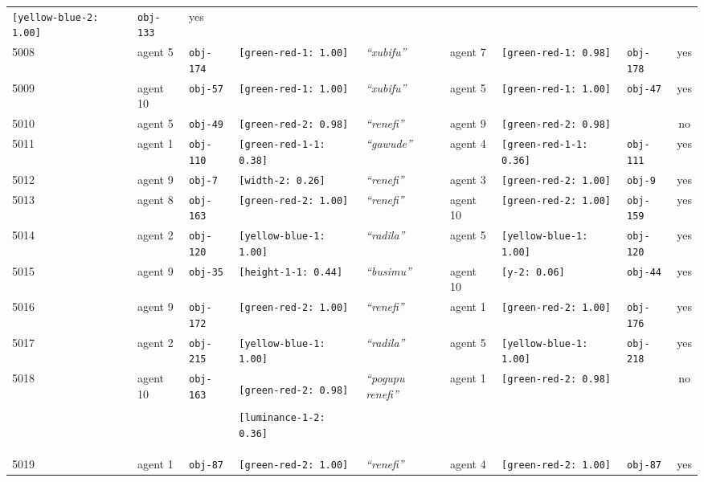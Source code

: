 {\begin{tabular}{@{}lllp{2.8cm}llp{2.8cm}lc@{}}
    \texttt{[yellow-blue-2: 1.00]} & \texttt{obj-133} & yes \\
    5008 & agent 5 & \texttt{obj-174} & \texttt{[green-red-1: 1.00]} & \textit{``xubifu''} & agent 7 & \texttt{[green-red-1: 0.98]} & \texttt{obj-178} & yes \\
    5009 & agent 10 & \texttt{obj-57} & \texttt{[green-red-1: 1.00]} & \textit{``xubifu''} & agent 5 & \texttt{[green-red-1: 1.00]} & \texttt{obj-47} & yes \\
    5010 & agent 5 & \texttt{obj-49} & \texttt{[green-red-2: 0.98]} & \textit{``renefi''} & agent 9 & \texttt{[green-red-2: 0.98]} & \texttt{} & no \\
    5011 & agent 1 & \texttt{obj-110} & \texttt{[green-red-1-1: 0.38]} & \textit{``gawude''} & agent 4 & \texttt{[green-red-1-1: 0.36]} & \texttt{obj-111} & yes \\
    5012 & agent 9 & \texttt{obj-7} & \texttt{[width-2: 0.26]} & \textit{``renefi''} & agent 3 & \texttt{[green-red-2: 1.00]} & \texttt{obj-9} & yes \\
    5013 & agent 8 & \texttt{obj-163} & \texttt{[green-red-2: 1.00]} & \textit{``renefi''} & agent 10 & \texttt{[green-red-2: 1.00]} & \texttt{obj-159} & yes \\
    5014 & agent 2 & \texttt{obj-120} & \texttt{[yellow-blue-1: 1.00]} & \textit{``radila''} & agent 5 & \texttt{[yellow-blue-1: 1.00]} & \texttt{obj-120} & yes \\
    5015 & agent 9 & \texttt{obj-35} & \texttt{[height-1-1: 0.44]} & \textit{``busimu''} & agent 10 & \texttt{[y-2: 0.06]} & \texttt{obj-44} & yes \\
    5016 & agent 9 & \texttt{obj-172} & \texttt{[green-red-2: 1.00]} & \textit{``renefi''} & agent 1 & \texttt{[green-red-2: 1.00]} & \texttt{obj-176} & yes \\
    5017 & agent 2 & \texttt{obj-215} & \texttt{[yellow-blue-1: 1.00]} & \textit{``radila''} & agent 5 & \texttt{[yellow-blue-1: 1.00]} & \texttt{obj-218} & yes \\
    5018 & agent 10 & \texttt{obj-163} & \texttt{[green-red-2: 0.98]}

    \texttt{[luminance-1-2: 0.36]} & \textit{``pogupu renefi''} & agent 1 & \texttt{[green-red-2: 0.98]} & \texttt{} & no \\
    5019 & agent 1 & \texttt{obj-87} & \texttt{[green-red-2: 1.00]} & \textit{``renefi''} & agent 4 & \texttt{[green-red-2: 1.00]} & \texttt{obj-87} & yes \\
  \end{tabular}}





